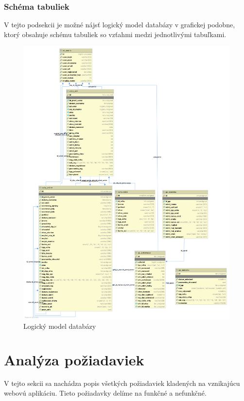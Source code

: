 \pagebreak 
\subsubsection{Schéma tabuliek}\label{schema-tabuliek}

V tejto podsekcii je možné nájsť logický model databázy v grafickej podobne, ktorý obsahuje schému tabuliek so vzťahmi medzi jednotlivými tabuľkami.

\begin{figure}[H]
	\includegraphics[width=1.0\textwidth]{media/analyza/diagram.png}
	\caption{Logický model databázy}
\end{figure}

\section{Analýza požiadaviek}
V tejto sekcii sa nachádza popis všetkých požiadaviek kladených na vznikajúcu webovú aplikáciu.
Tieto požiadavky delíme na funkčné a nefunkčné.


